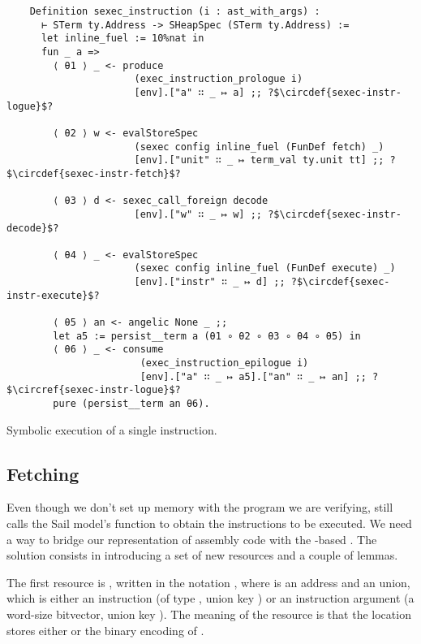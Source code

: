 \begin{listing}[htb]
  \startcstep
  \begin{verbatim}
    Definition sexec_instruction (i : ast_with_args) :
      ⊢ STerm ty.Address -> SHeapSpec (STerm ty.Address) :=
      let inline_fuel := 10%nat in
      fun _ a =>
        ⟨ θ1 ⟩ _ <- produce
                      (exec_instruction_prologue i)
                      [env].["a" ∷ _ ↦ a] ;; ?$\circdef{sexec-instr-logue}$?

        ⟨ θ2 ⟩ w <- evalStoreSpec
                      (sexec config inline_fuel (FunDef fetch) _)
                      [env].["unit" ∷ _ ↦ term_val ty.unit tt] ;; ?$\circdef{sexec-instr-fetch}$?

        ⟨ θ3 ⟩ d <- sexec_call_foreign decode
                      [env].["w" ∷ _ ↦ w] ;; ?$\circdef{sexec-instr-decode}$?

        ⟨ θ4 ⟩ _ <- evalStoreSpec
                      (sexec config inline_fuel (FunDef execute) _)
                      [env].["instr" ∷ _ ↦ d] ;; ?$\circdef{sexec-instr-execute}$?

        ⟨ θ5 ⟩ an <- angelic None _ ;;
        let a5 := persist__term a (θ1 ∘ θ2 ∘ θ3 ∘ θ4 ∘ θ5) in
        ⟨ θ6 ⟩ _ <- consume
                       (exec_instruction_epilogue i)
                       [env].["a" ∷ _ ↦ a5].["an" ∷ _ ↦ an] ;; ?$\circref{sexec-instr-logue}$?
        pure (persist__term an θ6).
  \end{verbatim}
  \caption{Symbolic execution of a single instruction.}
  \label{lst:sexec-instr}
\end{listing}

\subsection{Fetching}

Even though we don't set up memory with the program we are verifying,  still calls the Sail model's  function to obtain the instructions to be executed. We need a way to bridge our  representation of assembly code with the -based . The solution consists in introducing a set of new resources and a couple of lemmas.

The first resource is , written in the notation , where  is an address and  an union, which is either an instruction  (of type , union key ) or an instruction argument  (a word-size bitvector, union key ). The meaning of the resource is that the location  stores either  or the binary encoding of .

